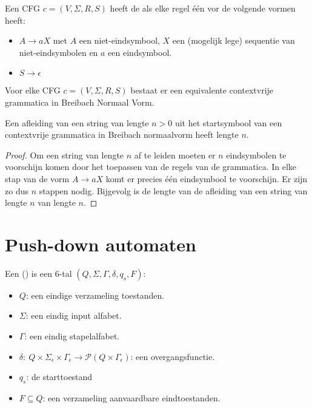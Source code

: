 \documentclass[main.tex]{subfiles}
\begin{document}
\begin{de}
  Een CFG $c = (V,\Sigma,R,S)$ heeft de  als elke regel \'e\'en vor de volgende vormen heeft:
  \begin{itemize}
  \item $A \rightarrow aX$ met $A$ een niet-eindsymbool, $X$ een (mogelijk lege) sequentie van niet-eindsymbolen en $a$ een eindsymbool.
  \item $S \rightarrow \epsilon$
  \end{itemize}
\end{de}

\begin{st}
  Voor elke CFG $c = (V,\Sigma,R,S)$ bestaat er een equivalente contextvrije grammatica in Breibach Normaal Vorm.
 
\end{st}

\begin{st}
  Een afleiding van een string van lengte $n>0$ uit het startsymbool van een contextvrije grammatica in Breibach normaalvorm heeft lengte $n$.
 
  \begin{proof}
    Om een string van lengte $n$ af te leiden moeten er $n$ eindsymbolen te voorschijn komen door het toepassen van de regels van de grammatica.
    In elke stap van de vorm $A \rightarrow aX$ komt er precies \'e\'en eindsymbool te voorschijn.
    Er zijn zo dus $n$ stappen nodig. Bijgevolg is de lengte van de afleiding van een string van lengte $n$ van lengte $n$.
  \end{proof}
\end{st}


\section{Push-down automaten}
\label{sec:push-down-automaten}

\begin{de}
  Een  () is een $6$-tal $(Q,\Sigma,\Gamma,\delta,q_{s},F)$:
  \begin{itemize}
  \item $Q$: een eindige verzameling toestanden.
  \item $\Sigma$: een eindig input alfabet.
  \item $\Gamma$: een eindig stapelalfabet.
  \item $\delta:\ Q\times \Sigma_{\epsilon} \times \Gamma_{\epsilon} \rightarrow \mathcal{P}(Q\times \Gamma_{\epsilon})$: een overgangsfunctie.
  \item $q_{s}$: de starttoestand
  \item $F\subseteq Q$: een verzameling aanvaardbare eindtoestanden.
  \end{itemize}
\end{de}
\end{document}
